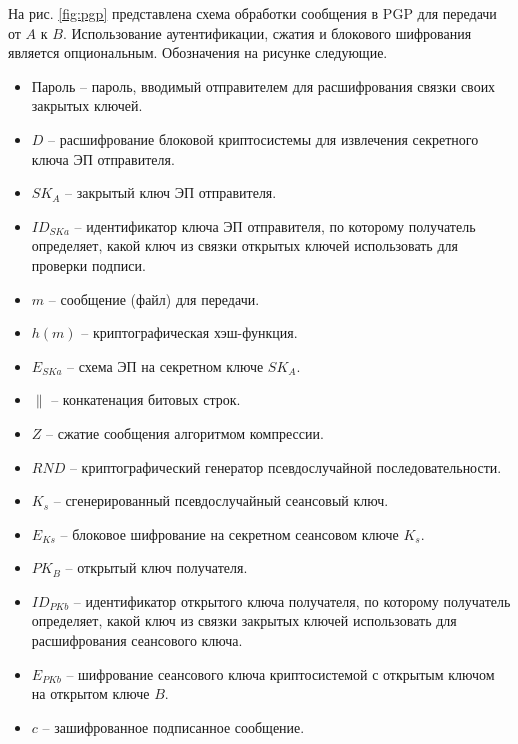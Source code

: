 На рис. \ref{fig:pgp} представлена схема обработки сообщения в PGP для передачи от $A$ к $B$. Использование аутентификации, сжатия и блокового шифрования является опциональным. Обозначения на рисунке следующие.
\begin{itemize}
    \item Пароль -- пароль, вводимый отправителем для расшифрования связки своих закрытых ключей.
    \item $D$ -- расшифрование блоковой криптосистемы для извлечения секретного ключа ЭП отправителя.
    \item $SK_A$ -- закрытый ключ ЭП отправителя.
    \item $ID_{SKa}$ -- идентификатор ключа ЭП отправителя, по которому получатель определяет, какой ключ из связки открытых ключей использовать для проверки подписи.
    \item $m$ -- сообщение (файл) для передачи.
    \item $h(m)$ -- криптографическая хэш-функция.
    \item $E_{SKa}$ -- схема ЭП на секретном ключе $SK_A$.
    \item $\|$ -- конкатенация битовых строк.
    \item $Z$ -- сжатие сообщения алгоритмом компрессии.
    \item $RND$ -- криптографический генератор псевдослучайной последовательности.
    \item $K_s$ -- сгенерированный псевдослучайный сеансовый ключ.
    \item $E_{Ks}$ -- блоковое шифрование на секретном сеансовом ключе $K_s$.
    \item $PK_B$ -- открытый ключ получателя.
    \item $ID_{PKb}$ -- идентификатор открытого ключа получателя, по которому получатель определяет, какой ключ из связки закрытых ключей использовать для расшифрования сеансового ключа.
    \item $E_{PKb}$ -- шифрование сеансового ключа криптосистемой с открытым ключом на открытом ключе $B$.
    \item $c$ -- зашифрованное подписанное сообщение.
\end{itemize}
